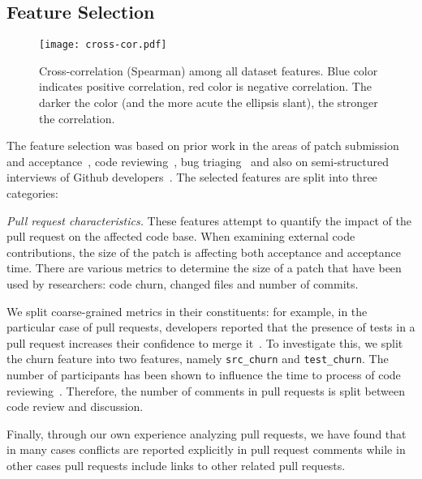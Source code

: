\documentclass{sig-alternate}
\begin{document}
\subsection{Feature Selection} 

\begin{figure}
  \begin{center}
    \texttt{[image: cross-cor.pdf]}
  \end{center}
  \caption{Cross-correlation (Spearman) among all dataset features. Blue color indicates positive correlation, red color is negative correlation. The darker
  the color (and the more acute the ellipsis slant), the stronger the correlation.}
  \label{fig:features}
\end{figure}

The feature selection was based on prior work in the areas of patch submission
and acceptance~\cite{Baysa12}, code
reviewing~\cite{Rigby13}, bug triaging~\cite{Giger10} and also on
semi-structured interviews of Github developers~\cite{Dabbi12, Pham13}.
The selected features are split into three categories:

  \emph{Pull request characteristics.} These features attempt to quantify the
  impact of the pull request on the affected code base. When examining external
  code contributions, the size of the patch is affecting both acceptance and
  acceptance time. There are various metrics to determine the size of a patch
  that have been used by researchers: code churn, changed files and number of
  commits.

  We split coarse-grained metrics in their constituents: for example,
  in the particular case of pull requests, developers reported that
  the presence of tests in a pull request increases their confidence to merge
  it~\cite{Pham13}. To investigate this, we split the churn feature into two
  features, namely \texttt{src\_churn} and \texttt{test\_churn}. The number of
  participants has been shown to influence the time to process of code
  reviewing~\cite{Rigby13}. Therefore, the number of comments in pull requests
  is split between code review and discussion.

  Finally, through our own experience analyzing pull
  requests, we have found that in many cases conflicts are reported explicitly
  in pull request comments while in other cases pull requests include links to
  other related pull requests.
\end{document}
